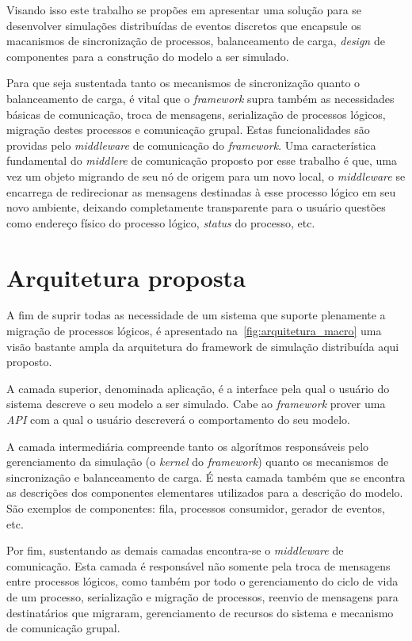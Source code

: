 Visando isso este trabalho se propões em apresentar uma solução para se desenvolver simulações distribuídas de eventos discretos que encapsule os macanismos de sincronização de processos, balanceamento de carga, \textit{design} de componentes para a construção do modelo a ser simulado.

Para que seja sustentada tanto os mecanismos de sincronização quanto o balanceamento de carga, é vital que o \textit{framework} supra também as necessidades básicas de comunicação, troca de mensagens, serialização de processos lógicos, migração destes processos e comunicação grupal. Estas funcionalidades são providas pelo \textit{middleware} de comunicação do \textit{framework}. Uma característica fundamental do \textit{middlere} de comunicação proposto por esse trabalho é que, uma vez um objeto migrando de seu nó de origem para um novo local, o \textit{middleware} se encarrega de redirecionar as mensagens destinadas à esse processo lógico em seu novo ambiente, deixando completamente transparente para o usuário questões como endereço físico do processo lógico, \textit{status} do processo, etc.

\section{Arquitetura proposta}

A fim de suprir todas as necessidade de um sistema que suporte plenamente a migração de processos lógicos, é apresentado na~\ref{fig:arquitetura_macro} uma visão bastante ampla da arquitetura do framework de simulação distribuída aqui proposto.

A camada superior, denominada aplicação, é a interface pela qual o usuário do sistema descreve o seu modelo a ser simulado. Cabe ao \textit{framework} prover uma \textit{API} com a qual o usuário descreverá o comportamento do seu modelo.

A camada intermediária compreende tanto os algorítmos responsáveis pelo gerenciamento da simulação (o \textit{kernel} do \textit{framework}) quanto os mecanismos de sincronização e balanceamento de carga. É nesta camada também que se encontra as descrições dos componentes elementares utilizados para a descrição do modelo. São exemplos de componentes: fila, processos consumidor, gerador de eventos, etc.

Por fim, sustentando as demais camadas encontra-se o \textit{middleware} de comunicação. Esta camada é responsável não somente pela troca de mensagens entre processos lógicos, como também por todo o gerenciamento do ciclo de vida de um processo, serialização e migração de processos, reenvio de mensagens para destinatários que migraram, gerenciamento de recursos do sistema e mecanismo de comunicação grupal. 

